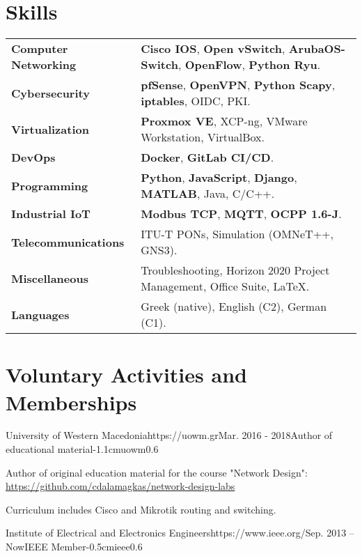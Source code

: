 \documentclass{mycv}
\begin{document}
	\section{Skills}
	\begin{tabular}{m{4.5cm} m{13cm}}\renewcommand{\arraystretch}{2}
		\textbf{Computer Networking}   	& \textbf{Cisco IOS}, \textbf{Open vSwitch}, \textbf{ArubaOS-Switch}, \textbf{OpenFlow}, \textbf{Python Ryu}.\\
		\textbf{Cybersecurity}			& \textbf{pfSense}, \textbf{OpenVPN}, \textbf{Python Scapy}, \textbf{iptables}, OIDC, PKI.\\
		\textbf{Virtualization}			& \textbf{Proxmox VE}, XCP-ng, VMware Workstation, VirtualBox.\\ 
		\textbf{DevOps}					& \textbf{Docker}, \textbf{GitLab CI/CD}. \\
		\textbf{Programming} 	    	& \textbf{Python}, \textbf{JavaScript}, \textbf{Django}, \textbf{MATLAB}, Java, C/C++. \\
		\textbf{Industrial IoT}			& \textbf{Modbus TCP}, \textbf{MQTT}, \textbf{OCPP 1.6-J}.\\
		\textbf{Telecommunications}   	& ITU-T PONs, Simulation (OMNeT++, GNS3). \\
		\textbf{Miscellaneous}			& Troubleshooting, Horizon 2020 Project Management, Office Suite, \LaTeX. \\
		\textbf{Languages} 				& Greek (native), English (C2), German (C1).
	\end{tabular}

	\section{Voluntary Activities and Memberships}
	\vspace*{0.125cm}	
	\begin{EntryDatedLogo}{University of Western Macedonia}{https://uowm.gr}{Mar. 2016 - 2018}{Author of educational material}{-1.1cm}{uowm}{0.6}
		\begin{Itemize}
			\item Author of original education material for the course "Network Design": \url{https://github.com/cdalamagkas/network-design-labs}
			\item Curriculum includes Cisco and Mikrotik routing and switching.
		\end{Itemize}
	\end{EntryDatedLogo}

	\vspace*{0.5cm}

	\begin{EntryDatedLogo}{Institute of Electrical and Electronics Engineers}{https://www.ieee.org/}{Sep. 2013 -- Now}{IEEE Member}{-0.5cm}{ieee}{0.6}
	\end{EntryDatedLogo}

\end{document}

